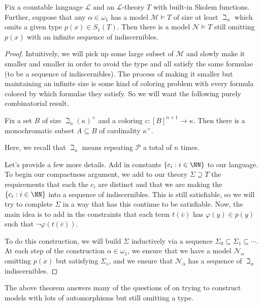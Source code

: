 \documentclass[../notes.tex]{subfiles}
\begin{document}
\begin{theorem}
	Fix a countable language $\mathcal L$ and an $\mathcal L$-theory $T$ with built-in Skolem functions. Further, suppose that any $\alpha\in\omega_1$ has a model $\mathcal M\models T$ of size at least $\beth_\alpha$ which omits a given type $p(x)\in S_1(T)$. Then there is a model $\mathcal N\models T$ still omitting $p(x)$ with an infinite sequence of indiscernibles.
\end{theorem}
\begin{proof}
	Intuitively, we will pick up some large subset of $\mathcal M$ and slowly make it smaller and smaller in order to avoid the type and all satisfy the same formulae (to be a sequence of indiscernibles). The process of making it smaller but maintaining an infinite size is some kind of coloring problem with every formula colored by which formulae they satisfy. So we will want the following purely combinatorial result.
	\begin{theorem}
		Fix a set $B$ of size $\beth_n(\kappa)^+$ and a coloring $c\colon[B]^{n+1}\to\kappa$. Then there is a monochromatic subset $A\subseteq B$ of cardinality $\kappa^+$.
	\end{theorem}
	Here, we recall that $\beth_n$ means repeating $\mathcal P$ a total of $n$ times.

	Let's provide a few more details. Add in constants $\{c_i:i\in\NN\}$ to our language. To begin our compactness argument, we add to our theory $\Sigma\supseteq T$ the requirements that each the $c_i$ are distinct and that we are making the $\{c_i:i\in\NN\}$ into a sequence of indiscernibles. This is still satisfiable, so we will try to complete $\Sigma$ in a way that has this continue to be satisfiable. Now, the main idea is to add in the constraints that each term $t(\overline v)$ has $\varphi(y)\in p(y)$ such that $\lnot\varphi(t(\overline c))$.

	To do this construction, we will build $\Sigma$ inductively via a sequence $\Sigma_0\subseteq\Sigma_1\subseteq\cdots$. At each step of the construction $\alpha\in\omega_1$, we ensure that we have a model $\mathcal N_\alpha$ omitting $p(x)$ but satisfying $\Sigma_s$, and we ensure that $\mathcal N_\alpha$ has a sequence of $\beth_\alpha$ indiscernibles.
\end{proof}
\begin{remark}
	The above theorem answers many of the questions of  on trying to construct models with lots of automorphisms but still omitting a type.
\end{remark}
\end{document}
